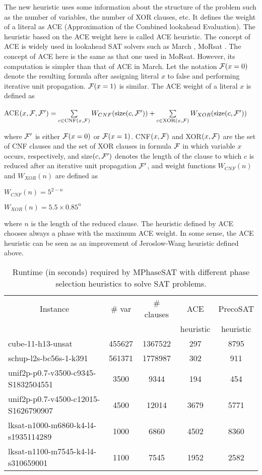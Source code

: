 \documentclass{llncs}
\begin{document}
The new heuristic uses some information about the structure of the
problem such as the number of variables, the number of XOR clauses,
etc. It defines the weight of a literal as ACE (Approximation of the
Combined lookahead Evaluation). The heuristic based on the ACE
weight here is called ACE heuristic. The concept of ACE is widely
used in lookahead SAT solvers such as March \cite {Marchhi:14},
MoRsat \cite {MoRsat:15}. The concept of ACE here is the same as
that one used in MoRsat. However, its computation is simpler than
that of ACE in March. Let the notation ${\cal F}(x=0)$ denote the
resulting formula after assigning literal $x$ to false and
performing iterative unit propagation. ${\cal F}(x=1)$ is similar.
The ACE weight of a literal $x$ is defined as
\begin{center}
 {\small
 ACE$(x,{\cal F},{\cal F}')=\sum\limits_{c \in \mathrm
{CNF}(x,{\cal F})}W_{CNF}(\mathrm {size}(c,{\cal
F}'))+\sum\limits_{c \in \mathrm {XOR}(x,{\cal F})}W_{XOR}(\mathrm
{size}(c,{\cal F}'))$}
\end{center}
\noindent where ${\cal F}'$ is either ${\cal F}(x=0)$ or ${\cal
F}(x=1)$. CNF$(x,\cal F)$ and XOR$(x, \cal F)$ are the set of CNF
clauses and the set of XOR clauses in formula $\cal F$ in which
variable $x$ occurs, respectively, and size$(c, {\cal F}')$ denotes
the length of the clause to which $c$ is reduced after an iterative
unit propagation ${\cal F}'$, and weight functions $W_{CNF}(n)$ and
$W_{XOR}(n)$ are defined as

\hskip 10mm  $W_{CNF}(n)=5^{2-n}$

\hskip 10mm  $W_{XOR}(n)=5.5 \times 0.85^n$

\noindent where $n$ is the length of the reduced clause. The
heuristic defined by ACE chooses always a phase with the maximum ACE
weight. In some sense, the ACE heuristic can be seen as an
improvement of Jeroslow-Wang heuristic defined above.

\begin{table}
\caption{ Runtime (in seconds) required by MPhaseSAT with different
phase selection heuristics to solve SAT problems.}
\begin{center}
\renewcommand{\arraystretch}{0.95}
\setlength\tabcolsep{4pt}
\begin{tabular}{l|c|c|c|c}
\hline  \hline
\multicolumn{1}{c|}{Instance} & \# var & \# clauses & ACE &
PrecoSAT \\
 &  &  & heuristic & heuristic \\
\hline cube-11-h13-unsat  & 455627 & 1367522 & 297 & 8795 \\
schup-l2s-bc56s-1-k391 & 561371 & 1778987 & 302 & 911 \\
unif2p-p0.7-v3500-c9345-S1832504551 & 3500 & 9344 & 194 & 454 \\
unif2p-p0.7-v4500-c12015-S1626790907 & 4500 & 12014 &   3679 &    5771 \\
lksat-n1000-m6860-k4-l4-s1935114289 & 1000 & 6860 & 4502 & 8360 \\
lksat-n1100-m7545-k4-l4-s310659001 & 1100 & 7545& 1952 &   2582 \\
\hline
\end{tabular}
\end{center}
\end{table}
\end{document}
